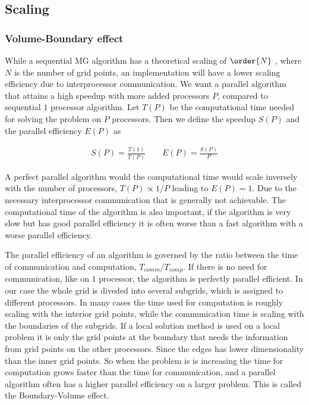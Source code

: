 	\subsection{Scaling}
		\subsubsection{Volume-Boundary effect}
		While a sequential MG algorithm has a theoretical scaling of \(\order{N}\)
		\citep{press_numerical_1988}, where \(N\) is the number of grid points, an
		implementation will have a lower scaling efficiency due to interprocessor
		communication. We want a parallel algorithm that attains a high speedup with
		more added processors \(P\),  compared to sequential \(1\) processor algorithm.
		Let \(T(P)\) be the computational time needed for solving the problem on \(P\)
		processors. Then we define the speedup \(S(P)\) and the parallel efficiency \(E(P)\) as

		\begin{align}
			S(P) = \frac{T(1)}{T(P)} \qquad E(P) = \frac{S(P)}{P}
		\end{align}

		A perfect parallel algorithm would the computational time would scale inversely
		with the number of processors, \(T(P) \propto 1/P\) leading to \( E(P) =1 \).
		Due to the necessary interprocessor communication that is generally not
		achievable. The computational time of the algorithm is also important, if
		the algorithm is very slow but has good parallel efficiency it is often
		worse than a fast algorithm with a worse parallel efficiency.

		The parallel efficiency of an algorithm is governed by the ratio between the
		time of communication and computation, \(T_{comm}/T_{comp}\). If there is no
		need for communication, like on \(1\) processor, the algorithm is perfectly
		parallel efficient. In our case the whole grid is diveded into several subgrids,
		which is assigned to different processors. In many cases the time used for
		computation is roughly scaling with the interior grid points, while the
		communication time is scaling with the boundaries of the subgrids. If a
		local solution method is used on a local problem it is only the grid points
		at the boundary that needs the information from grid points on the other
		processors. Since the edges has lower dimensionality than the inner grid
		points. So when the problem is is increasing the time for computation grows
		faster than the time for communication, and a parallel algorithm often has a
		higher parallel efficiency on a larger problem. This is called the Boundary-Volume effect.

